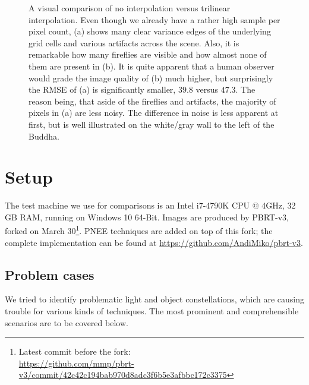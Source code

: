 \begin{figure}
\caption{A visual comparison of no interpolation versus trilinear interpolation. Even though we already have a rather high sample per pixel count, (a) shows many clear variance edges of the underlying grid cells and various artifacts across the scene. Also, it is remarkable how many fireflies are visible and how almost none of them are present in (b). It is quite apparent that a human observer would grade the image quality of (b) much higher, but surprisingly the RMSE of (a) is significantly smaller, $39.8$ versus $47.3$. The reason being, that aside of the fireflies and artifacts, the majority of pixels in (a) are less noisy. The difference in noise is less apparent at first, but is well illustrated on the white/gray wall to the left of the Buddha.}
\label{fig:intComparison}
\end{figure}


\section{Setup}
\label{sec:setup}
The test machine we use for comparisons is an Intel i7-4790K CPU @ 4GHz, 32 GB RAM, running on Windows 10 64-Bit. Images are produced by PBRT-v3, forked on March 30\footnote{Latest commit before the fork: \\ \url{https://github.com/mmp/pbrt-v3/commit/42c42c194bab970d8adc3f6b5e3afbbc172c3375}}. PNEE techniques are added on top of this fork; the complete implementation can be found at \url{https://github.com/AndiMiko/pbrt-v3}.

\subsection{Problem cases}

We tried to identify problematic light and object constellations, which are causing trouble for various kinds of techniques. The most prominent and comprehensible scenarios are to be covered below. 


